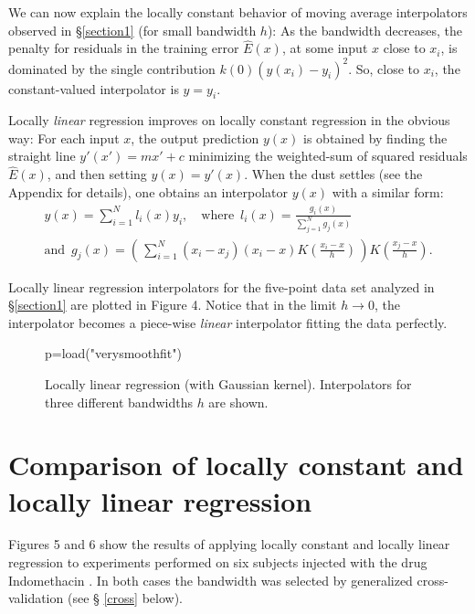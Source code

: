 \documentclass[11pt, reqno]{amsart}
\begin{document}
We can now explain the locally constant behavior of moving average
interpolators observed in \S\ref{section1} (for small bandwidth $h$):
As the bandwidth decreases, the penalty for residuals in the training
error $\hat E(x)$, at some input $x$ close to $x_i$, is dominated by
the single contribution $k(0)(y(x_i)-y_i)^2$. So, close to $x_i$, the
constant-valued interpolator is $y=y_i$.

Locally {\em linear} regression improves on locally constant
regression in the obvious way: For each input $x$, the output
prediction $y(x)$ is obtained by finding the straight line $y'(x') =
mx' + c$ minimizing the weighted-sum of squared residuals $\hat E(x)$,
and then setting $y(x)=y'(x)$. When the dust settles (see the Appendix
for details), one obtains an interpolator $y(x)$ with a similar form:
\begin{gather}
  y(x)=\sum_{i=1}^N l_i(x)y_i,\quad
\text{where}\enspace l_i(x)=\frac{g_i(x)}{\sum_{j=1}^N g_j(x)}\label{form}\\
\text{and}\enspace g_j(x)=\left(\, \sum_{i=1}^N
(x_i-x_j)(x_i-x)K\left(\frac{x_i-x}{h}\right)\,\right)K\left(\frac{x_j-x}{h}\right).\label{form2}
\end{gather}

Locally linear regression interpolators for the five-point data set
analyzed in \S\ref{section1} are plotted in Figure 4. Notice that in
the limit $h \rightarrow 0$, the interpolator becomes a piece-wise
{\em linear} interpolator fitting the data perfectly.

\begin{figure}
  \begin{sagesilent}
     p=load("verysmoothfit")
  \end{sagesilent}
  \centering 
  \caption{{} Locally linear regression (with Gaussian kernel). Interpolators
    for three different bandwidths $h$ are shown.}
\end{figure}

\section{Comparison of locally constant and \\locally linear regression}
Figures 5 and 6 show the results of applying locally constant and
locally linear regression to experiments performed on six subjects
injected with the drug Indomethacin \cite{Kwan_etal_76}. In both cases
the bandwidth was selected by generalized cross-validation (see \S
\ref{cross} below).
\end{document}

